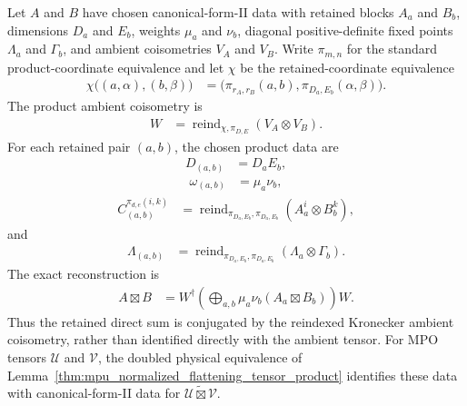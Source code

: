 \begin{lemma}
    \label{thm:mpu_tensor_product_cfii_data}
    \leanok
    Let $A$ and $B$ have chosen canonical-form-II data with retained blocks
    $A_a$ and $B_b$, dimensions $D_a$ and $E_b$, weights $\mu_a$ and $\nu_b$,
    diagonal positive-definite fixed points $\Lambda_a$ and $\Gamma_b$, and
    ambient coisometries $V_A$ and $V_B$. Write $\pi_{m,n}$ for the standard
    product-coordinate equivalence and let $\chi$ be the retained-coordinate
    equivalence
    \begin{align}
        \chi\bigl((a,\alpha),(b,\beta)\bigr)
         & =\bigl(\pi_{r_A,r_B}(a,b),
        \pi_{D_a,E_b}(\alpha,\beta)\bigr).
    \end{align}
    The product ambient coisometry is
    \begin{align}
        W
         & =\operatorname{reind}_{\chi,\pi_{D,E}}(V_A\otimes V_B).
    \end{align}
    For each retained pair $(a,b)$, the chosen product data are
    \begin{align}
        D_{(a,b)} & =D_aE_b,
    \end{align}
    \begin{align}
        \omega_{(a,b)} & =\mu_a\nu_b,
    \end{align}
    \begin{align}
        C_{(a,b)}^{\pi_{d,e}(i,k)}
         & =\operatorname{reind}_{\pi_{D_a,E_b},\pi_{D_a,E_b}}
        (A_a^i\otimes B_b^k),
    \end{align}
    and
    \begin{align}
        \Lambda_{(a,b)}
         & =\operatorname{reind}_{\pi_{D_a,E_b},\pi_{D_a,E_b}}
        (\Lambda_a\otimes\Gamma_b).
    \end{align}
    The exact reconstruction is
    \begin{align}
        A\boxtimes B
         & =W^\dagger
        \left(\bigoplus_{a,b}\mu_a\nu_b
            (A_a\boxtimes B_b)\right)W.
        \label{eq:mpu_tensor_product_cfii_reconstruction}
    \end{align}
    Thus the retained direct sum is conjugated by the reindexed Kronecker
    ambient coisometry, rather than identified directly with the ambient
    tensor. For MPO tensors $\mathcal U$ and $\mathcal V$, the doubled physical
    equivalence of
    Lemma~\ref{thm:mpu_normalized_flattening_tensor_product} identifies these
    data with canonical-form-II data for
    $\widetilde{\mathcal U\boxtimes\mathcal V}$.


\end{lemma}
